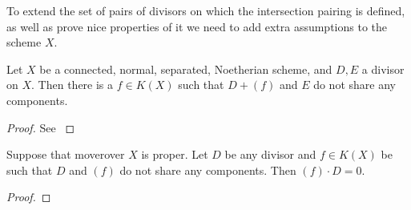 To extend the set of pairs of divisors on which the intersection pairing is defined, as well as prove nice properties of it we need to add extra assumptions to the scheme $X$. 


\begin{lemma}
	Let $X$ be a connected, normal, separated, Noetherian scheme, and $D, E$ a divisor on $X$. 
	Then there is a $f \in K(X)$ such that $D + (f)$ and $E$ do not share any components. 
\end{lemma}
\begin{proof}
	See \cite[]{liuAlgebraicGeometryArithmetic2002}
\end{proof}

\begin{lemma}
	Suppose that moverover $X$ is proper. 
	Let  $D$ be any divisor and $f \in K(X)$ be such that $D$ and $(f)$ do not share any components. 
	Then $(f)\cdot D = 0$. 
\end{lemma}
\begin{proof}
	
\end{proof}



